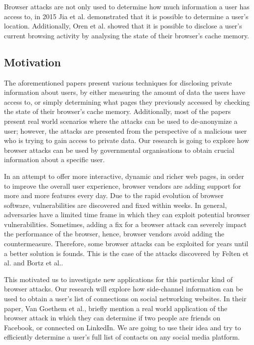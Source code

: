 \documentclass[a4paper,11pt]{article}
\begin{document}
Browser attacks are not only used to determine how much information a user has access to, in 2015 Jia et al.\cite{jia2015know} demonstrated that it is possible to determine a user's location. Additionally, Oren et al.\cite{oren2015spy} showed that it is possible to disclose a user's current browsing activity by analysing the state of their browser's cache memory.

\subsection*{Motivation}

The aforementioned papers present various techniques for disclosing private information about users, by either measuring the amount of data the users have access to, or simply determining what pages they previously accessed by checking the state of their browser's cache memory. Additionally, most of the papers present real world scenarios where the attacks can be used to de-anonymize a user; however, the attacks are presented from the perspective of a malicious user who is trying to gain access to private data. Our research is going to explore how browser attacks can be used by governmental organisations to obtain crucial information about a specific user.

In an attempt to offer more interactive, dynamic and richer web pages, in order to improve the overall user experience, browser vendors are adding support for more and more features every day. Due to the rapid evolution of browser software, vulnerabilities are discovered and fixed within weeks. In general, adversaries have a limited time frame in which they can exploit potential browser vulnerabilities. Sometimes, adding a fix for a browser attack can severely impact the performance of the browser, hence, browser vendors avoid adding the countermeasure. Therefore, some browser attacks can be exploited for years until a better solution is founds. This is the case of the attacks discovered by Felten et al.\cite{felten2000timing} and Bortz et al.\cite{bortz2007exposing}.

This motivated us to investigate new applications for this particular kind of browser attacks. Our research will explore how side-channel information can be used to obtain a user's list of connections on social networking websites. In their paper, Van Goethem et al.\cite{van2015clock}, briefly mention a real world application of the browser attack in which they can determine if two people are friends on Facebook, or connected on LinkedIn. We are going to use their idea and try to efficiently determine a user's full list of contacts on any social media platform.
\end{document}
